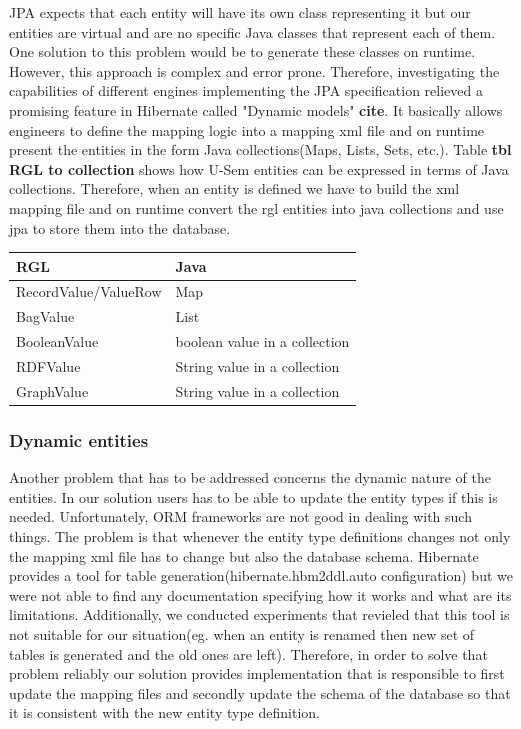 \documentclass[a4paper, notitlepage]{article}
\begin{document}
JPA expects that each entity will have its own class representing it but our entities are virtual and are no specific Java classes that represent each of them. One solution to this problem would be to generate these classes on runtime. However, this approach is complex and error prone. Therefore, investigating the capabilities of different engines implementing the JPA specification relieved a promising feature in Hibernate called "Dynamic models" \textbf{cite}. It basically allows engineers to define the mapping logic into a mapping xml file and on runtime present the entities in the form Java collections(Maps, Lists, Sets, etc.). Table \textbf{tbl RGL to collection} shows how U-Sem entities can be expressed in terms of Java collections. Therefore, when an entity is defined we have to build the xml mapping file and on runtime convert the rgl entities into java collections and use jpa to store them into the database.

\begin{center}
    \begin{tabular}{ | l | l |}
    \hline
    RGL & Java  \\ \hline
    RecordValue/ValueRow & Map  \\ \hline
    BagValue & List  \\ \hline
    BooleanValue & boolean value in a collection  \\ \hline
    RDFValue & String value in a collection  \\ \hline
	GraphValue & String  value in a collection  \\ \hline

    \end{tabular}
\end{center}
 
\subsubsection{Dynamic entities}

Another problem that has to be addressed concerns the dynamic nature of the entities. In our solution users has to be able to update the entity types if this is needed. Unfortunately, ORM frameworks are not good in dealing with such things. The problem is that whenever the entity type definitions changes not only the mapping xml file has to change but also the database schema. Hibernate provides a tool for table generation(hibernate.hbm2ddl.auto configuration) but we were not able to find any documentation specifying how it works and what are its limitations. Additionally, we conducted experiments that revieled that this tool is not suitable for our situation(eg. when an entity is renamed then new set of tables is generated and the old ones are left). Therefore, in order to solve that problem reliably our solution provides implementation that is responsible to first update the mapping files and secondly update the schema of the database so that it is consistent with the new entity type definition.
\end{document}
